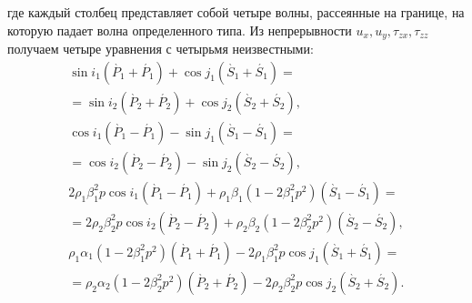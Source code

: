 где каждый столбец представляет собой четыре волны, рассеянные на границе, на которую падает волна определенного типа. Из непрерывности $u_x, u_y, \tau_{zx}, \tau_{zz}$ получаем четыре уравнения с четырьмя неизвестными:
\begin{align}
\sin{i_1(\grave{P_1} + \acute{P_1})} + \cos{j_1(\grave{S_1} + \acute{S_1})} = \nonumber\\
	= \sin{i_2(\grave{P_2} + \acute{P_2})} + \cos{j_2(\grave{S_2} + \acute{S_2})}, \nonumber\\
\cos{i_1(\grave{P_1} - \acute{P_1})} - \sin{j_1(\grave{S_1} - \acute{S_1})} = \nonumber\\
	= \cos{i_2(\grave{P_2} - \acute{P_2})} - \sin{j_2(\grave{S_2} - \acute{S_2})}, \nonumber\\
2 \rho_1 \beta_1^2 p \cos{i_1(\grave{P_1} - \acute{P_1})} + \rho_1 \beta_1 (1 - 2 \beta_1^2 p^2) (\grave{S_1} - \acute{S_1}) = \nonumber\\
	= 2 \rho_2 \beta_2^2 p \cos{i_2(\grave{P_2} - \acute{P_2})} + \rho_2 \beta_2 (1 - 2 \beta_2^2 p^2) (\grave{S_2} - \acute{S_2}), \nonumber\\
\rho_1 \alpha_1 (1 - 2 \beta_1^2 p^2) (\grave{P_1} + \acute{P_1}) - 2 \rho_1 \beta_1^2 p \cos{j_1(\grave{S_1} + \acute{S_1})} = \nonumber\\
	= \rho_2 \alpha_2 (1 - 2 \beta_2^2 p^2) (\grave{P_2} + \acute{P_2}) - 2 \rho_2 \beta_2^2 p \cos{j_2(\grave{S_2} + \acute{S_2})}.
\end{align}

